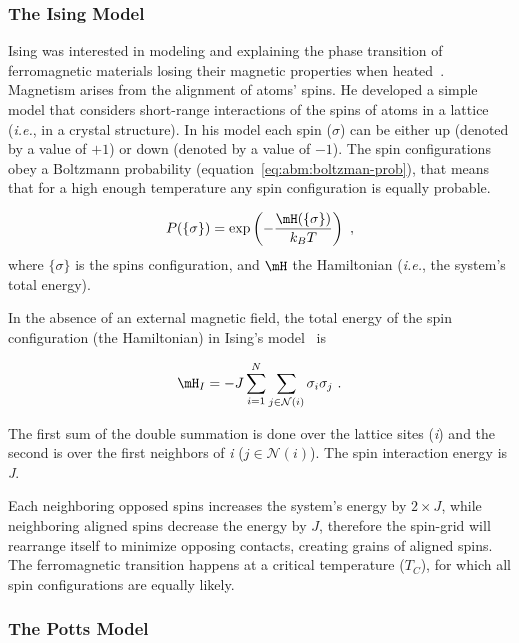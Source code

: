 \subsubsection{The Ising Model}\label{sec:abm:cpm-history:ising}

Ising was interested in modeling and explaining the phase transition of ferromagnetic materials losing their magnetic properties when heated~\cite{ising1925beitrag}. Magnetism arises from the alignment of atoms' spins. He developed a simple model that considers short-range interactions of the spins of atoms in a lattice (\textit{i.e.}, in a crystal structure). In his model each spin ($\sigma$) can be either up (denoted by a value of $+1$) or down (denoted by a value of $-1$). The spin configurations obey a Boltzmann probability (equation~\ref{eq:abm:boltzman-prob}), that means that for a high enough temperature any spin configuration is equally probable.

\begin{equation}\label{eq:abm:boltzman-prob}
P(\{\sigma\}) = \exp\left(-\frac{\mH(\{\sigma\})}{k_B T}\right)\,\,,
\end{equation}
\noindent where $\{\sigma\}$ is the spins configuration, and $\mH$ the Hamiltonian (\textit{i.e.}, the system's total energy).

In the absence of an external magnetic field, the total energy of the spin configuration (the Hamiltonian) in Ising's model~\cite{ising1925beitrag} is

\begin{equation}\label{eq:abm:ising-hamiltonian}
\mH_I = -J\sum_{i=1}^{N}\sum_{j\in\mathcal{N}(i)} \sigma_i\sigma_j\,\,.
\end{equation}

\noindent The first sum of the double summation is done over the lattice sites (\textit{i}) and the second is over the first neighbors of \textit{i} ($j\in\mathcal{N}(i)$). The spin interaction energy is \textit{J}.

Each neighboring opposed spins increases the system's energy by $2 \times J$, while neighboring aligned spins decrease the energy by $J$, therefore the spin-grid will rearrange itself to minimize opposing contacts, creating grains of aligned spins. The ferromagnetic transition happens at a critical temperature ($T_C$), for which all spin configurations are equally likely.

\subsubsection{The Potts Model}\label{sec:abm:cpm-history:potts}

